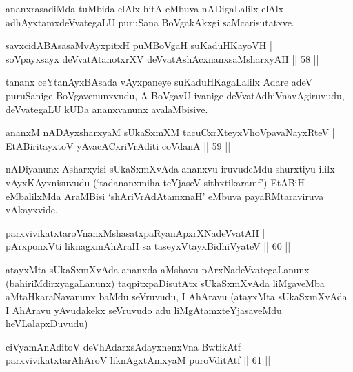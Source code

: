 \begin{artha}
ananxrasadiMda tuMbida elAlx hitA eMbuva nADigaLalilx elAlx adhAyxtamxdeVvategaLU puruSana BoVgakAkxgi saMcarisutatxve.
\end{artha}


\begin{shl}
savxcidABAsasaMvAyxpitxH puMBoVgaH suKaduHKayoVH |\\
soV\s payxsayx deVvatAtanotxrXV deVvatAshAcxnanxsaMsharxyAH \hfill || 58 || 
\end{shl}

\begin{artha}
tananx ceYtanAyxBAsada vAyxpaneye suKaduHKagaLalilx Adare adeV puruSanige BoVgavenunxvudu, A BoVgavU ivanige deVvatAdhiVnavAgiruvudu, deVvategaLU kUDa ananxvanunx avalaMbisive.
\end{artha}

\begin{shl}
ananxM nADAyxsharxyaM sUkaSxmXM tacuCxrXteyxVhoVpavaNayxRteV |\\
EtABiritayxtoV yAvacACxriVrAditi coVdanA \hfill || 59 || 
\end{shl}

\begin{artha}
nADiyanunx Asharxyisi sUkaSxmXvAda ananxvu iruvudeMdu shurxtiyu ililx vAyxKAyxnisuvudu (`tadananxmiha teYjaseV sithxtikaramf') EtABiH \mdash eMbalilxMda AraMBisi `shAriVrAdAtamxnaH' eMbuva payaRMtaraviruva vAkayxvide.
\end{artha}

\begin{shl}
parxvivikatxtaroV\s nanxMshasatxpaRyanApxrXNadeVvatAH |\\
pArxponxVti liknagxmAhAraH sa taseyxVtayxBidhiVyateV \hfill || 60 || 
\end{shl}

\begin{artha}
atayxMta sUkaSxmXvAda ananxda aMshavu pArxNadeVvategaLanunx (bahiriMdirxyagaLanunx) taqpitxpaDisutAtx sUkaSxmXvAda liMgaveMba aMtaHkaraNavanunx baMdu seVruvudu, I AhAravu (atayxMta sUkaSxmXvAda I AhAravu yAvudakekx seVruvudo adu liMgAtamxteYjasaveMdu heVLalapxDuvudu)
\end{artha}

\begin{shl}
ciVyamAnAditoV deVhAdarxsAdayxnenxVna BwtikAtf |\\
parxvivikatxtarAhAroV liknAgxtAmx\s yaM puroVditAtf \hfill || 61 || 
\end{shl}

